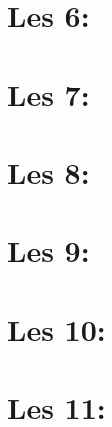\documentclass[12pt,a4paper]{article}
\begin{document}
	\section{Les 6: }
	\section{Les 7: }
	\section{Les 8: }
	\section{Les 9: }
	\section{Les 10: }
	\section{Les 11: }
\end{document}
